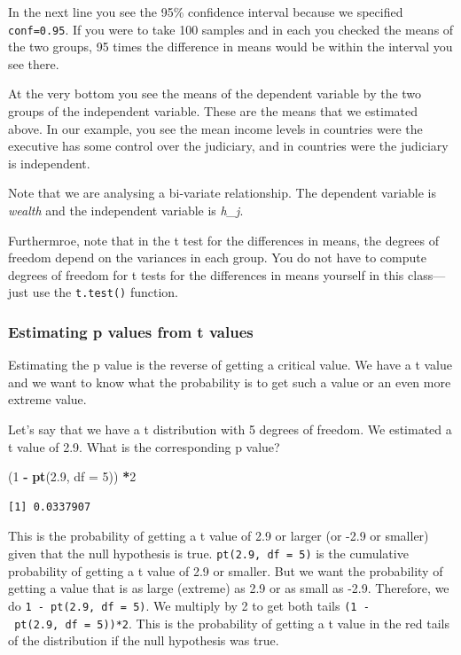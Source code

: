 \documentclass[]{article}
\newenvironment{Shaded}{\begin{snugshade}}{\end{snugshade}}
\newcommand{\KeywordTok}[1]{\textcolor[rgb]{0.13,0.29,0.53}{\textbf{#1}}}
\newcommand{\DataTypeTok}[1]{\textcolor[rgb]{0.13,0.29,0.53}{#1}}
\newcommand{\DecValTok}[1]{\textcolor[rgb]{0.00,0.00,0.81}{#1}}
\newcommand{\FloatTok}[1]{\textcolor[rgb]{0.00,0.00,0.81}{#1}}
\newcommand{\StringTok}[1]{\textcolor[rgb]{0.31,0.60,0.02}{#1}}
\newcommand{\OperatorTok}[1]{\textcolor[rgb]{0.81,0.36,0.00}{\textbf{#1}}}
\newcommand{\NormalTok}[1]{#1}
\theoremstyle{definition}
\theoremstyle{definition}
\theoremstyle{definition}
\theoremstyle{remark}
\begin{document}
In the next line you see the 95\% confidence interval because we
specified \texttt{conf=0.95}. If you were to take 100 samples and in
each you checked the means of the two groups, 95 times the difference in
means would be within the interval you see there.

At the very bottom you see the means of the dependent variable by the
two groups of the independent variable. These are the means that we
estimated above. In our example, you see the mean income levels in
countries were the executive has some control over the judiciary, and in
countries were the judiciary is independent.

Note that we are analysing a bi-variate relationship. The dependent
variable is \emph{wealth} and the independent variable is \emph{h\_j}.

Furthermroe, note that in the t test for the differences in means, the
degrees of freedom depend on the variances in each group. You do not
have to compute degrees of freedom for t tests for the differences in
means yourself in this class---just use the \texttt{t.test()} function.

\subsubsection{Estimating p values from t
values}\label{estimating-p-values-from-t-values}

Estimating the p value is the reverse of getting a critical value. We
have a t value and we want to know what the probability is to get such a
value or an even more extreme value.

Let's say that we have a t distribution with 5 degrees of freedom. We
estimated a t value of 2.9. What is the corresponding p value?

\begin{Shaded}
\begin{Highlighting}[]
\NormalTok{(}\DecValTok{1} \OperatorTok{-}\StringTok{ }\KeywordTok{pt}\NormalTok{(}\FloatTok{2.9}\NormalTok{, }\DataTypeTok{df =} \DecValTok{5}\NormalTok{)) }\OperatorTok{*}\DecValTok{2}
\end{Highlighting}
\end{Shaded}

\begin{verbatim}
[1] 0.0337907
\end{verbatim}

This is the probability of getting a t value of 2.9 or larger (or -2.9
or smaller) given that the null hypothesis is true.
\texttt{pt(2.9,\ df\ =\ 5)} is the cumulative probability of getting a t
value of 2.9 or smaller. But we want the probability of getting a value
that is as large (extreme) as 2.9 or as small as -2.9. Therefore, we do
\texttt{1\ -\ pt(2.9,\ df\ =\ 5)}. We multiply by 2 to get both tails
\texttt{(1\ -\ pt(2.9,\ df\ =\ 5))*2}. This is the probability of
getting a t value in the red tails of the distribution if the null
hypothesis was true.
\end{document}
